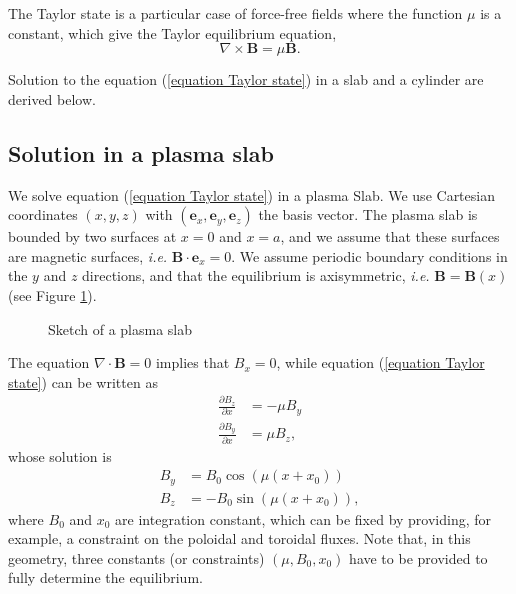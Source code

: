 \documentclass[my_thesis.tex]{subfiles}
\begin{document}
The Taylor state \citep{Taylor1974,Taylor1986} is a particular case of force-free fields where the function $\mu$ is a constant, which give the Taylor equilibrium equation,
\begin{equation}
	\nabla\times\mathbf{B}=\mu\mathbf{B}. \label{equation Taylor state}
\end{equation}

Solution to the equation (\ref{equation Taylor state}) in a slab and a cylinder are derived below.

\subsection{Solution in a plasma slab}
We solve equation (\ref{equation Taylor state}) in a plasma Slab. We use Cartesian coordinates $(x,y,z)$ with $(\mathbf{e}_x,\mathbf{e}_y,\mathbf{e}_z)$ the basis vector. The plasma slab is bounded by two surfaces at $x=0$ and $x=a$, and we assume that these surfaces are magnetic surfaces, \textit{i.e.} $\mathbf{B}\cdot\mathbf{e}_x=0$. We assume periodic boundary conditions in the $y$ and $z$ directions, and that the equilibrium is axisymmetric, \textit{i.e.} $\mathbf{B}=\mathbf{B}(x)$ (see Figure \ref{fig. plasma slab}).

\begin{figure}
	\centering
	\caption{Sketch of a plasma slab}
	\label{fig. plasma slab}
\end{figure}

The equation $\nabla\cdot\mathbf{B}=0$ implies that $B_x=0$, while equation (\ref{equation Taylor state}) can be written as
\begin{align}
	\frac{\partial B_z}{\partial x} &= -\mu B_y\\
	\frac{\partial B_y}{\partial x} &= \mu B_z,
\end{align}
whose solution is
\begin{align}
	B_y &= B_0 \cos(\mu (x + x_0))\\
	B_z &= -B_0 \sin(\mu (x + x_0)),
\end{align}
where $B_0$ and $x_0$ are integration constant, which can be fixed by providing, for example, a constraint on the poloidal and toroidal fluxes. Note that, in this geometry, three constants (or constraints) $(\mu,B_0,x_0)$ have to be provided to fully determine the equilibrium.
\end{document}
